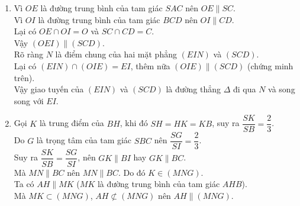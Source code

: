 \begin{bt}
{\begin{enumerate}
\begin{center}
		\end{center}
		\item Vì $OE$ là đường trung bình của tam giác $SAC$ nên $OE \parallel SC$.\\
		Vì $OI$ là đường trung bình của tam giác $BCD$ nên $OI \parallel CD$.\\
		Lại có $OE \cap OI =O$ và $SC \cap CD = C$.\\
		Vậy $(OEI)\parallel (SCD)$.\\
		Rõ ràng $N$ là điểm chung của hai mặt phẳng $(EIN)$ và $(SCD)$.\\
		Lại có $(EIN) \cap (OIE)=EI$, thêm nữa $(OIE)\parallel (SCD)$ (chứng minh trên).\\
		Vậy giao tuyến của $(EIN)$ và $(SCD)$ là đường thẳng $\Delta$ đi qua  $N$ và song song với $EI$.
		\item Gọi $K$ là trung điểm của $BH$, khi đó $SH=HK=KB$, suy ra $\dfrac{SK}{SB}=\dfrac{2}{3}$.\\
		Do $G$ là trọng tâm của tam giác $SBC$ nên $\dfrac{SG}{SI}=\dfrac{2}{3}$.\\
		Suy ra $\dfrac{SK}{SB}=\dfrac{SG}{SI}$, nên $GK\parallel BI$ hay $GK \parallel BC$.\\
		Mà $MN\parallel BC$ nên $MN \parallel BC$. Do đó $K\in (MNG)$.\\
		Ta có $AH\parallel MK$ ($MK$ là đường trung bình của tam giác $AHB$).\\
		Mà $MK \subset (MNG)$, $AH \not\subset (MNG)$ nên $AH \parallel (MNG)$.
	\end{enumerate}
	
}
\end{bt}

